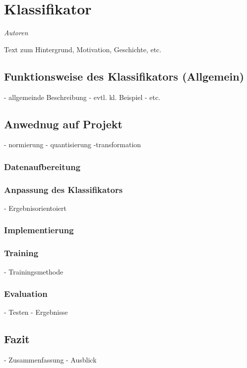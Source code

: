 \section{Klassifikator}
\textit{Autoren}

Text zum Hintergrund, Motivation, Geschichte, etc. 

\subsection{Funktionsweise des Klassifikators (Allgemein)}
- allgemeinde Beschreibung
- evtl. kl. Beispiel
- etc. 

\subsection{Anwednug auf Projekt}
- normierung
- quantisierung
-transformation

\subsubsection{Datenaufbereitung}

\subsubsection{Anpassung des Klassifikators}
- Ergebnisorientoiert

\subsubsection{Implementierung}

\subsubsection{Training}
- Trainingsmethode

\subsubsection{Evaluation}
- Testen
- Ergebnisse

\subsection{Fazit}
- Zusammenfassung 
- Ausblick